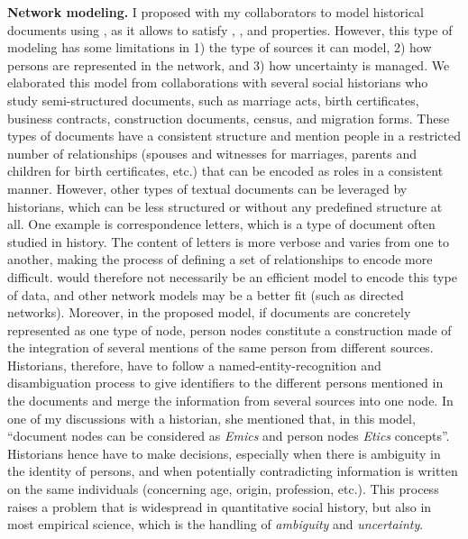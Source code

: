\noindent\textbf{Network modeling.} I proposed with my collaborators to model historical documents using \modelplural, as it allows to satisfy \traceability, \simplicity, and \reality properties. However, this type of modeling has some limitations in 1) the type of sources it can model, 2) how persons are represented in the network, and 3) how uncertainty is managed.
We elaborated this model from collaborations with several social historians who study semi-structured documents, such as marriage acts, birth certificates, business contracts, construction documents, census, and migration forms.
These types of documents have a consistent structure and mention people in a restricted number of relationships (spouses and witnesses for marriages, parents and children for birth certificates, etc.) that can be encoded as roles in a consistent manner.
However, other types of textual documents can be leveraged by historians, which can be less structured or without any predefined structure at all.
One example is correspondence letters, which is a type of document often studied in history\cite{rollingerCicerosSupplicatioUnd2017, edelsteinHistoricalResearchDigital2017}.
The content of letters is more verbose and varies from one to another, making the process of defining a set of relationships to encode more difficult.
\modelpluralcapital would therefore not necessarily be an efficient model to encode this type of data, and other network models may be a better fit (such as directed networks).
Moreover, in the proposed model, if documents are concretely represented as one type of node, person nodes constitute a construction made of the integration of several mentions of the same person from different sources.
Historians, therefore, have to follow a named-entity-recognition and disambiguation process to give identifiers to the different persons mentioned in the documents and merge the information from several sources into one node.
In one of my discussions with a historian, she mentioned that, in this model, ``document nodes can be considered as \emph{Emics} and person nodes \emph{Etics} concepts''\cite{headlandEmicsEticsInsider1990}.
Historians hence have to make decisions, especially when there is ambiguity in the identity of persons, and when potentially contradicting information is written on the same individuals (concerning age, origin, profession, etc.).
This process raises a problem that is widespread in quantitative social history, but also in most empirical science, which is the handling of \emph{ambiguity} and \emph{uncertainty}.

